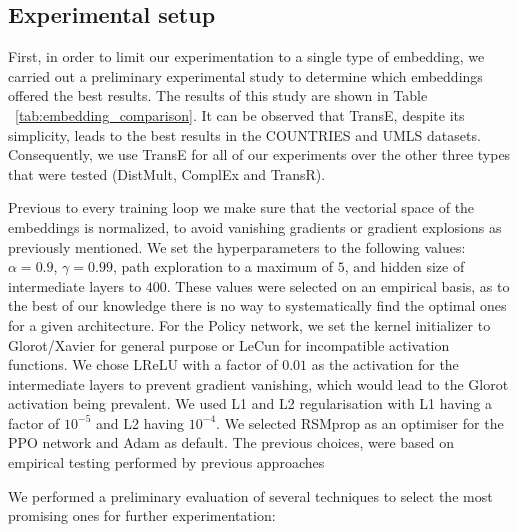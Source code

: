\subsection{Experimental setup}


First, in order to limit our experimentation to a single type of embedding, we carried out a preliminary experimental study to determine which embeddings offered the best results. The results of this study are shown in Table ~\ref{tab:embedding_comparison}. It can be observed that TransE, despite its simplicity, leads to the best results in the COUNTRIES and UMLS datasets. Consequently, we use TransE for all of our experiments over the other three types that were tested (DistMult, ComplEx and TransR).

Previous to every training loop we make sure that the vectorial space of the embeddings is normalized, to avoid vanishing gradients or gradient explosions as previously mentioned. We set the hyperparameters to the following values: $\alpha=0.9$, $\gamma=0.99$, path exploration to a maximum of $5$, and hidden size of intermediate layers to $400$. These values were selected on an empirical basis, as to the best of our knowledge there is no way to systematically find the optimal ones for a given architecture.
For the Policy network, we set the kernel initializer to Glorot/Xavier
for general purpose or LeCun
for incompatible activation functions. We chose LReLU with a factor of $0.01$ as the activation for the intermediate layers to prevent gradient vanishing, which would lead to the Glorot activation being prevalent. We used L1 and L2 regularisation with L1 having a factor of $10^{-5}$ and L2 having $10^{-4}$. We selected RSMprop
as an optimiser for the PPO network and Adam
as default. The previous choices, were based on empirical testing performed by previous approaches


We performed a preliminary evaluation of several techniques to select the most promising ones for further experimentation:

